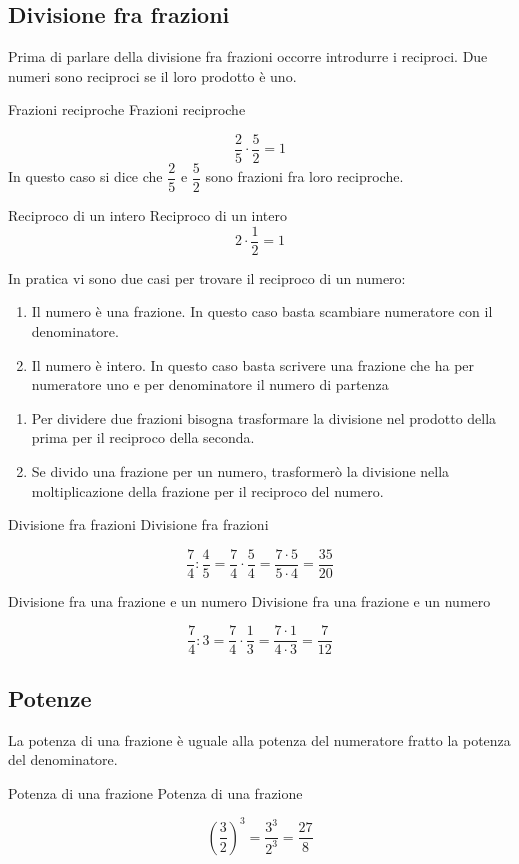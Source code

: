 	 \subsection{Divisione fra frazioni}
Prima di parlare della divisione fra frazioni occorre introdurre i reciproci. Due numeri sono reciproci se il loro prodotto è uno.
\begin{esempiot}{Frazioni reciproche}{}
 Frazioni reciproche
 \end{esempiot}
 \[\dfrac{2}{5}\cdot\dfrac{5}{2}=1\]In questo caso si dice che $\dfrac{2}{5}$ e $\dfrac{5}{2}$ sono frazioni fra loro reciproche.
\begin{esempiot}{Reciproco di un intero}{}
Reciproco di un intero \[2\cdot\dfrac{1}{2}=1\]
\end{esempiot}
In pratica  vi sono due casi per trovare il reciproco di un numero:
\begin{enumerate}
	\item Il numero è una frazione. In questo caso basta scambiare numeratore con il denominatore.
	\item Il numero è  intero. In questo caso basta scrivere una frazione che ha per numeratore uno e per denominatore il numero di partenza 
\end{enumerate}
\begin{enumerate}
\item Per dividere due frazioni bisogna trasformare la divisione nel prodotto della prima per il reciproco della seconda.
\item Se divido una frazione per un numero, trasformerò la divisione nella moltiplicazione della frazione per il reciproco del numero.
\end{enumerate}
\begin{esempiot}{Divisione fra frazioni}{}
Divisione fra frazioni
\end{esempiot}
\[\dfrac{7}{4}:\dfrac{4}{5}=\dfrac{7}{4}\cdot\dfrac{5}{4}=\dfrac{7\cdot 5}{5\cdot 4}=\dfrac{35}{20}\]
\begin{esempiot}{Divisione fra una frazione e un numero}{}
Divisione fra una frazione e un numero
\end{esempiot}
\[\dfrac{7}{4}:3=\dfrac{7}{4}\cdot\dfrac{1}{3}=\dfrac{7\cdot 1}{4\cdot 3}=\dfrac{7}{12} \]

\subsection{Potenze}
La potenza di una frazione è uguale alla potenza del numeratore fratto la potenza del denominatore.
\begin{esempiot}{Potenza di una frazione}{}
Potenza di una frazione
\end{esempiot}
\[\left( \dfrac{3}{2}\right)^3=\dfrac{3^3}{2^3}=\dfrac{27}{8} \]



